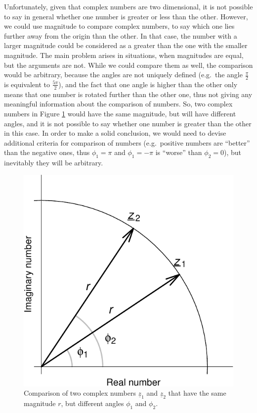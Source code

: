 \documentclass[
]{book}
\begin{document}
Unfortunately, given that complex numbers are two dimensional, it is not possible to say in general whether one number is greater or less than the other. However, we could use magnitude to compare complex numbers, to say which one lies further away from the origin than the other. In that case, the number with a larger magnitude could be considered as a greater than the one with the smaller magnitude. The main problem arises in situations, when magnitudes are equal, but the arguments are not. While we could compare them as well, the comparison would be arbitrary, because the angles are not uniquely defined (e.g.~the angle \(\frac{\pi}{2}\) is equivalent to \(\frac{5\pi}{2}\)), and the fact that one angle is higher than the other only means that one number is rotated further than the other one, thus not giving any meaningful information about the comparison of numbers. So, two complex numbers in Figure \ref{fig:complexPlaneCircle} would have the same magnitude, but will have different angles, and it is not possible to say whether one number is greater than the other in this case. In order to make a solid conclusion, we would need to devise additional criteria for comparison of numbers (e.g.~positive numbers are ``better'' than the negative ones, thus \(\phi_1=\pi\) and \(\phi_1=-\pi\) is ``worse'' than \(\phi_2=0\)), but inevitably they will be arbitrary.

\begin{figure}
\centering
\includegraphics{Svetunkov---Svetunkov---Complex-Valued-Econometrics_files/figure-latex/complexPlaneCircle-1.pdf}
\caption{\label{fig:complexPlaneCircle}Comparison of two complex numbers \(\underline{z}_1\) and \(\underline{z}_2\) that have the same magnitude \(r\), but different angles \(\phi_1\) and \(\phi_2\).}
\end{figure}
\end{document}
